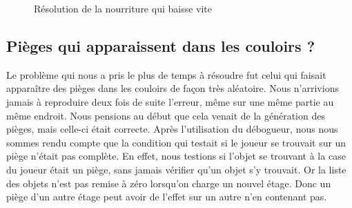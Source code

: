 \documentclass[11pt]{report}
\begin{document}
			\begin{figure}[ht]
			    \centering
			    \qquad
			    \caption{Résolution de la nourriture qui baisse vite}%
			\end{figure}
	
	\subsection*{Pièges qui apparaissent dans les couloirs ?}
	
		Le problème qui nous a pris le plus de temps à résoudre fut celui qui faisait apparaître des pièges dans les couloirs de façon très aléatoire. Nous n'arrivions jamais à reproduire deux fois de suite l'erreur, même sur une même partie au même endroit. Nous pensions au début que cela venait de la génération des pièges, mais celle-ci était correcte. Après l'utilisation du débogueur, nous nous sommes rendu compte que la condition qui testait si le joueur se trouvait sur un piège n'était pas complète. En effet, nous testions si l'objet se trouvant à la case du joueur était un piège, sans jamais vérifier qu'un objet s'y trouvait. Or la liste des objets n'est pas remise à zéro lorsqu'on charge un nouvel étage. Donc un piège d'un autre étage peut avoir de l'effet sur un autre n'en contenant pas.
\end{document}
